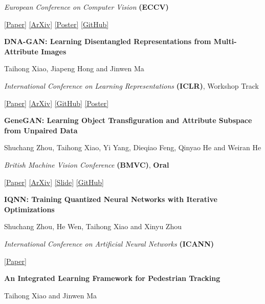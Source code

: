 \documentclass[11pt, a4paper]{article} %
\newcommand{\years}[1]{\marginnote{\scriptsize #1}} %
\begin{document}
\emph{European Conference on Computer Vision} \textbf{(ECCV)}

\href{http://openaccess.thecvf.com/content_ECCV_2018/papers/Taihong_Xiao_ELEGANT_Exchanging_Latent_ECCV_2018_paper.pdf}{[Paper]}
\href{https://arxiv.org/abs/1803.10562}{[ArXiv]}
\href{https://prinsphield.github.io/ECCV-2018/poster/poster.pdf}{[Poster]}
\href{https://github.com/Prinsphield/ELEGANT}{[GitHub]}


\years{2018}\textbf{DNA-GAN: Learning Disentangled Representations from Multi-Attribute Images}

Taihong Xiao, Jiapeng Hong and Jinwen Ma

\emph{International Conference on Learning Representations} \textbf{(ICLR)}, Workshop Track

\href{https://openreview.net/pdf?id=rkX1FF_UM}{[Paper]} 
\href{https://arxiv.org/abs/1711.05415v2}{[ArXiv]}
\href{https://github.com/Prinsphield/DNA-GAN}{[GitHub]}
\href{https://prinsphield.github.io/ICLR-2018/poster/poster.pdf}{[Poster]}


%
%

\years{2017}\textbf{GeneGAN: Learning Object Transfiguration and Attribute Subspace from Unpaired Data}

Shuchang Zhou, Taihong Xiao, Yi Yang, Dieqiao Feng, Qinyao He and Weiran He

\emph{British Machine Vision Conference} \textbf{(BMVC)}, \textbf{Oral} 

\href{https://www.dropbox.com/s/3qofizvcfi4pa0f/0520.pdf?dl=1}{[Paper]}
\href{http://arxiv.org/abs/1705.04932}{[ArXiv]}
\href{http://zsc.github.io/GeneGAN-BMVC2017.pdf}{[Slide]}
\href{https://github.com/Prinsphield/GeneGAN}{[GitHub]}


\years{2017}\textbf{IQNN: Training Quantized Neural Networks with Iterative Optimizations}

Shuchang Zhou, He Wen, Taihong Xiao and Xinyu Zhou

\emph{International Conference on Artificial Neural Networks} \textbf{(ICANN)}

\href{https://link.springer.com/chapter/10.1007\%2F978-3-319-68612-7_78}{[Paper]} 

\years{2017}\textbf{An Integrated Learning Framework for Pedestrian Tracking}

Taihong Xiao and Jinwen Ma
\end{document}
